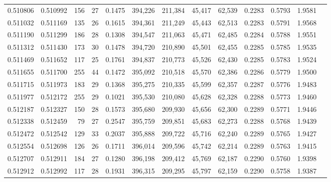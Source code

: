 \begin{tabular}{rrrrrrrrrrrrr}
0.510806 & 0.510992 &    156 &    27 &                                     0.1475 & 394,226 & 211,384 &  45,417 &  62,539 & 0.2283 & 0.5793 & 1.9581 \\
0.511032 & 0.511169 &    135 &    26 &                                     0.1615 & 394,361 & 211,249 &  45,443 &  62,513 & 0.2283 & 0.5791 & 1.9568 \\
0.511190 & 0.511299 &    186 &    28 &                                     0.1308 & 394,547 & 211,063 &  45,471 &  62,485 & 0.2284 & 0.5788 & 1.9551 \\
0.511312 & 0.511430 &    173 &    30 &                                     0.1478 & 394,720 & 210,890 &  45,501 &  62,455 & 0.2285 & 0.5785 & 1.9535 \\
0.511469 & 0.511652 &    117 &    25 &                                     0.1761 & 394,837 & 210,773 &  45,526 &  62,430 & 0.2285 & 0.5783 & 1.9524 \\
0.511655 & 0.511700 &    255 &    44 &                                     0.1472 & 395,092 & 210,518 &  45,570 &  62,386 & 0.2286 & 0.5779 & 1.9500 \\
0.511715 & 0.511973 &    183 &    29 &                                     0.1368 & 395,275 & 210,335 &  45,599 &  62,357 & 0.2287 & 0.5776 & 1.9483 \\
0.511977 & 0.512172 &    255 &    29 &                                     0.1021 & 395,530 & 210,080 &  45,628 &  62,328 & 0.2288 & 0.5773 & 1.9460 \\
0.512187 & 0.512327 &    150 &    28 &                                     0.1573 & 395,680 & 209,930 &  45,656 &  62,300 & 0.2289 & 0.5771 & 1.9446 \\
0.512338 & 0.512459 &     79 &    27 &                                     0.2547 & 395,759 & 209,851 &  45,683 &  62,273 & 0.2288 & 0.5768 & 1.9439 \\
0.512472 & 0.512542 &    129 &    33 &                                     0.2037 & 395,888 & 209,722 &  45,716 &  62,240 & 0.2289 & 0.5765 & 1.9427 \\
0.512554 & 0.512698 &    126 &    26 &                                     0.1711 & 396,014 & 209,596 &  45,742 &  62,214 & 0.2289 & 0.5763 & 1.9415 \\
0.512707 & 0.512911 &    184 &    27 &                                     0.1280 & 396,198 & 209,412 &  45,769 &  62,187 & 0.2290 & 0.5760 & 1.9398 \\
0.512912 & 0.512992 &    117 &    28 &                                     0.1931 & 396,315 & 209,295 &  45,797 &  62,159 & 0.2290 & 0.5758 & 1.9387 \\

\end{tabular}
